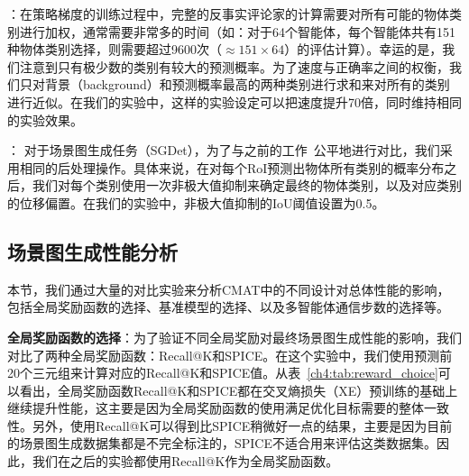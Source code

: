 ：在策略梯度的训练过程中，完整的反事实评论家的计算需要对所有可能的物体类别进行加权，通常需要非常多的时间（如：对于64个智能体，每个智能体共有151种物体类别选择，则需要超过9600次（$\approx 151 \times 64$）的评估计算）。幸运的是，我们注意到只有极少数的类别有较大的预测概率。为了速度与正确率之间的权衡，我们只对背景（background）和预测概率最高的两种类别进行求和来对所有的类别进行近似。在我们的实验中，这样的实验设定可以把速度提升70倍，同时维持相同的实验效果。


： 对于场景图生成任务（SGDet），为了与之前的工作~\cite{zellers2018neural,zhang2019graphical}公平地进行对比，我们采用相同的后处理操作。具体来说，在对每个RoI预测出物体所有类别的概率分布之后，我们对每个类别使用一次非极大值抑制来确定最终的物体类别，以及对应类别的位移偏置。在我们的实验中，非极大值抑制的IoU阈值设置为0.5。


\subsection{场景图生成性能分析}
本节，我们通过大量的对比实验来分析CMAT中的不同设计对总体性能的影响，包括全局奖励函数的选择、基准模型的选择、以及多智能体通信步数的选择等。

\textbf{全局奖励函数的选择}：为了验证不同全局奖励对最终场景图生成性能的影响，我们对比了两种全局奖励函数：Recall@K和SPICE。在这个实验中，我们使用预测前20个三元组来计算对应的Recall@K和SPICE值。从表~\ref{ch4:tab:reward_choice}可以看出，全局奖励函数Recall@K和SPICE都在交叉熵损失（XE）预训练的基础上继续提升性能，这主要是因为全局奖励函数的使用满足优化目标需要的整体一致性。另外，使用Recall@K可以得到比SPICE稍微好一点的结果，主要是因为目前的场景图生成数据集都是不完全标注的，SPICE不适合用来评估这类数据集。因此，我们在之后的实验都使用Recall@K作为全局奖励函数。

\begin{table}[htbp]
\begin{center}
\end{center}
\caption{不同全局奖励函数的选择对性能的影响}
\label{ch4:tab:reward_choice}
\end{table}

